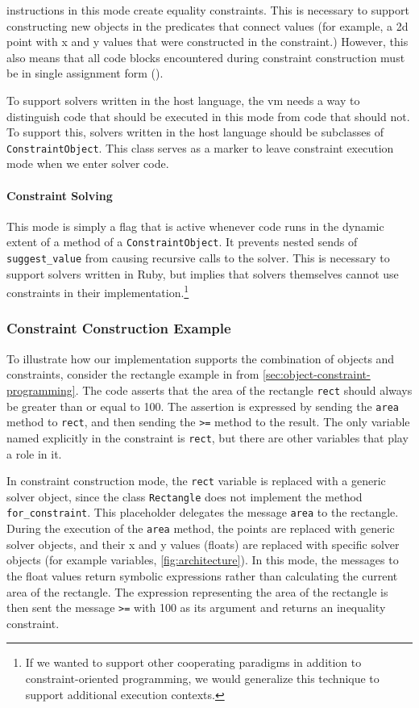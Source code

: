 \store instructions in this mode create equality constraints. This is
necessary to support constructing new objects in the predicates that
connect values (for example, a 2d point with x and y values that were
constructed in the constraint.) However, this also means that all code
blocks encountered during constraint construction must be in single
assignment form ().

To support solvers written in the host language, the \ac{vm} needs a
way to distinguish code that should be executed in this mode from code
that should not.  To support this, solvers written in the host
language should be subclasses of \lstinline{ConstraintObject}.  This
class serves as a marker to leave constraint execution mode when we
enter solver code.

\paragraph{Constraint Solving}
This mode is simply a flag that is active whenever code runs in the
dynamic extent of a method of a \lstinline{ConstraintObject}. It
prevents nested sends of \lstinline{suggest_value} from causing
recursive calls to 
the solver. This is necessary to support solvers written in
Ruby, but implies that solvers themselves cannot use constraints in
their implementation.\footnote{If we wanted to support other
  cooperating paradigms in addition to constraint-oriented
  programming, we would generalize this technique to support additional
  execution contexts.}

\subsubsection*{Constraint Construction Example}
\label{sec:constraint-construction-example}
To illustrate how our implementation supports the combination of
objects and constraints, consider the rectangle example in \langname
from \autoref{sec:object-constraint-programming}.  The code
asserts that the area of the rectangle \lstinline{rect} should always
be greater than or equal to 100. The assertion is expressed by sending the
\lstinline{area} method to \lstinline{rect}, and then sending 
the \lstinline{>=} method to the
result. The only variable named explicitly in the constraint is 
\lstinline{rect}, but there are other variables that play a role in it.

In constraint construction mode, the \lstinline{rect} variable is
replaced with a generic solver object, since the class
\lstinline{Rectangle} does not implement the method
\lstinline{for_constraint}. This placeholder delegates the message
\lstinline{area} to the rectangle. During the execution of the
\lstinline{area} method, the points are replaced with generic solver
objects, and their x and y values (floats) are replaced with specific
solver objects (for example \zthree variables, \cf
{\autoref{fig:architecture}}).  In this mode, the messages to the
float values return symbolic expressions rather than calculating the
current area of the rectangle.  The expression representing the area
of the rectangle is then sent the
message \lstinline{>=} with 100 as its argument and returns an
inequality constraint.

